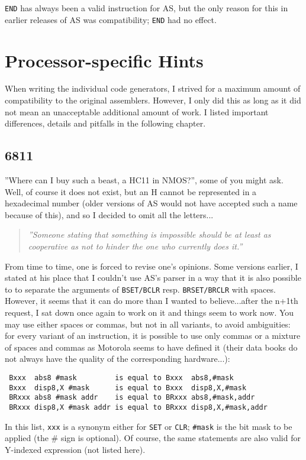 \documentclass[12pt,twoside]{report}
\newcommand{\tty}[1]{{\tt #1}}
\begin{document}
\tty{END} has always been a valid instruction for AS, but the only reason
for this in earlier releases of AS was compatibility; \tty{END} had no
effect.


\cleardoublepage
\chapter{Processor-specific Hints}

When writing the individual code generators, I strived for a maximum
amount of compatibility to the original assemblers.  However, I only did this
as long as it did not mean an unacceptable additional amount of work. 
I listed important differences, details and pitfalls in the following
chapter.


\section{6811}

''Where can I buy such a beast, a HC11 in NMOS?'', some of you might
ask.  Well, of course it does not exist, but an H cannot be
represented in a hexadecimal number (older versions of AS would not
have accepted such a name because of this), and so I decided to omit
all the letters...
\par
\begin{quote}{\it
''Someone stating that something is impossible should be at least as
 cooperative as not to hinder the one who currently does it.''
}\end{quote}
From time to time, one is forced to revise one's opinions.  Some versions
earlier, I stated at his place that I couldn't use AS's parser in a way
that it is also possible to to separate the arguments of \tty{BSET/BCLR}
resp. \tty{BRSET/BRCLR} with spaces.  However, it seems that it can do
more than I wanted to believe...after the n+1th request, I sat down once
again to work on it and things seem to work now.  You may use either
spaces or commas, but not in all variants, to avoid ambiguities: for
every variant of an instruction, it is possible to use only commas or a
mixture of spaces and commas as Motorola seems to have defined it (their
data books do not always have the quality of the corresponding
hardware...):
\begin{verbatim}
 Bxxx  abs8 #mask         is equal to Bxxx  abs8,#mask
 Bxxx  disp8,X #mask      is equal to Bxxx  disp8,X,#mask
 BRxxx abs8 #mask addr    is equal to BRxxx abs8,#mask,addr
 BRxxx disp8,X #mask addr is equal to BRxxx disp8,X,#mask,addr
\end{verbatim}
In this list, \tty{xxx} is a synonym either for \tty{SET} or \tty{CLR};
\tty{\#mask} is the bit mask to be applied (the \# sign is optional).  Of
course, the same statements are also valid for Y-indexed expression (not
listed here).
\end{document}
